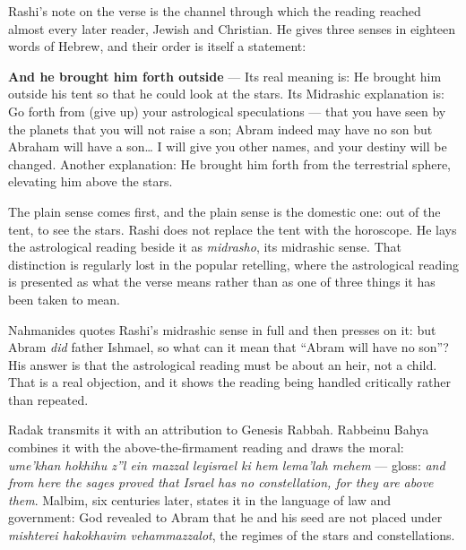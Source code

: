 Rashi's note on the verse is the channel through which the reading reached
almost every later reader, Jewish and Christian. He gives three senses in
eighteen words of Hebrew, and their order is itself a statement:

\begin{studyframe}
\textbf{And he brought him forth outside} --- Its real meaning is: He brought him
outside his tent so that he could look at the stars. Its Midrashic explanation
is: Go forth from (give up) your astrological speculations --- that you have seen
by the planets that you will not raise a son; Abram indeed may have no son but
Abraham will have a son\dots{} I will give you other names, and your destiny will
be changed. Another explanation: He brought him forth from the terrestrial
sphere, elevating him above the stars.
\end{studyframe}

The plain sense comes first, and the plain sense is the domestic one: out of the
tent, to see the stars. Rashi does not replace the tent with the horoscope. He
lays the astrological reading beside it as \textit{midrasho}, its midrashic
sense. That distinction is regularly lost in the popular retelling, where the
astrological reading is presented as what the verse means rather than as one of
three things it has been taken to mean.

Nahmanides quotes Rashi's midrashic sense in full and then presses on it: but
Abram \emph{did} father Ishmael, so what can it mean that ``Abram will have no
son''? His answer is that the astrological reading must be about an heir, not a
child. That is a real
objection, and it shows the reading being handled critically rather than
repeated.

Radak transmits it with an attribution to Genesis Rabbah. Rabbeinu Bahya
combines it with the above-the-firmament reading and draws the moral:
\textit{ume'khan hokhihu z''l ein mazzal leyisrael ki hem lema'lah mehem} ---
gloss: \emph{and from here the sages proved that Israel has no constellation,
for they are above them}. Malbim, six centuries later, states it in the language
of law and government: God revealed to Abram that he and his seed are not placed
under \textit{mishterei hakokhavim vehammazzalot}, the regimes of the stars and
constellations.

